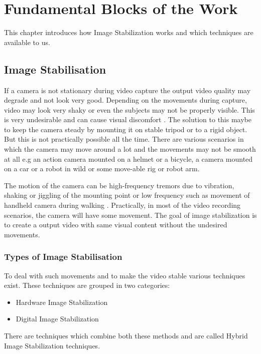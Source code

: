 \chapter{Fundamental Blocks of the Work} \label{chapter_two}

This chapter introduces how Image Stabilization works and which techniques are available to us. 

\section{Image Stabilisation}
\label{sec:image_stab}
If a camera is not stationary during video capture the output video quality may degrade and not look very good. Depending on the movements during capture, video may look very shaky or even the subjects may not be properly visible. This is very undesirable and can cause visual discomfort \citep{jia2012probabilistic}. The solution to this maybe to keep the camera steady by mounting it on stable tripod or to a rigid object. But this is not practically possible all the time. There are various scenarios in which the camera may move around a lot and the movements may not be smooth at all e.g an action camera mounted on a helmet or a bicycle, a camera mounted on a car or a robot in wild or some move-able rig or robot arm.

The motion of the camera can be high-frequency tremors due to vibration, shaking or jiggling of the mounting point \citep{ryu2012robust} or low frequency such as movement of handheld camera during walking \citep{dis_review}. Practically, in most of the video recording scenarios, the camera will have some movement. The goal of image stabilization is to create a output video with same visual content without the undesired movements. 

\subsection{Types of Image Stabilisation}
To deal with such movements and to make the video stable various techniques exist. These techniques are grouped in two categories:

\begin{itemize}
\item Hardware Image Stabilization
\item Digital Image Stabilization  
\end{itemize}
There are techniques which combine both these methods and are called Hybrid Image Stabilization techniques.

